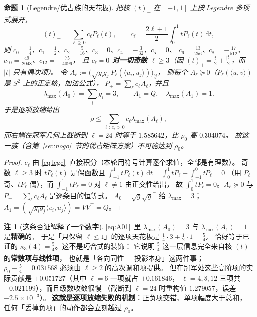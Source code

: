 \documentclass[UTF8,11pt]{ctexart}
\newtheorem{proposition}[theorem]{命题}
\theoremstyle{definition}
\newtheorem{remark}[theorem]{注}
\newcommand{\dd}{\,\mathrm{d}}
\begin{document}
\begin{proposition}[Legendre/优占族的天花板]\label{prop:ceilharm}
把核 $(t)_+$ 在 $[-1,1]$ 上按 Legendre 多项式展开，
\begin{equation}\label{eq:legc}
(t)_+=\sum_{\ell\ge0}c_\ell P_\ell(t),\qquad
c_\ell=\frac{2\ell+1}{2}\int_0^1tP_\ell(t)\dd t ,
\end{equation}
则 $c_0=\frac14$、$c_1=\frac12$、$c_2=\frac5{16}$、$c_3=0$、$c_4=-\frac3{32}$、$c_5=0$、
$c_6=\frac{13}{256}$、$c_8=-\frac{17}{512}$、$c_{10}=\frac{49}{2048}$、$c_{12}=-\frac{75}{4096}$，
且 \textbf{$c_\ell=0$ 对一切奇数 $\ell\ge3$}（因 $(t)_+=\frac t2+\frac{|t|}2$，而 $|t|$ 只有偶次项）。
令 $A_\ell:=\bigl(\sqrt{g_ig_j}\,P_\ell(\langle u_i,u_j\rangle)\bigr)_{ij}$，
则每个 $A_\ell\succeq0$（$P_\ell(\langle u,v\rangle)$ 是 $S^2$ 上的正定核，加法公式），
$P_+=\sum_\ell c_\ell A_\ell$，并且
\begin{equation}\label{eq:A01}
\lambda_{\max}(A_0)=\sum_ig_i=3,\qquad A_1=Q,\quad \lambda_{\max}(A_1)=1 .
\end{equation}
于是逐项放缩给出
\[
\rho\le\sum_{\ell:\,c_\ell>0}c_\ell\lambda_{\max}(A_\ell),
\]
而右端在冠军几何上截断到 $\ell=24$ 时等于 $1.585642$，比 $\rho_0$ 高 $0.304074$。
故这一族（含第~\ref{sec:nogo}~节的优占矩阵方案）不可能达到 $\rho_0$。
\end{proposition}

\begin{proof}
$c_\ell$ 由 \eqref{eq:legc}~直接积分（本轮用符号计算逐个求值，全部是有理数）。
奇数 $\ell\ge3$ 时 $tP_\ell(t)$ 是偶函数且 $\int_{-1}^1tP_\ell(t)\dd t=\int_0^1tP_\ell+\int_{-1}^0tP_\ell=0$
（用 $P_\ell$ 奇、$tP_\ell$ 偶），而 $\int_{-1}^1tP_\ell=0$ 对 $\ell\ne1$ 由正交性给出，
故 $\int_0^1tP_\ell=0$。$A_\ell\succeq0$ 与 $P_+=\sum_\ell c_\ell A_\ell$ 是逐条目的恒等式。
$A_0=\sqrt g\sqrt g{}^\top$ 给 $\lambda_{\max}=3$；$A_1=(\sqrt{g_ig_j}\langle u_i,u_j\rangle)=VV^\top=Q$。
\end{proof}

\begin{remark}[这条否证解释了一个数字]\label{rmk:harm54}
\eqref{eq:A01}~里 $\lambda_{\max}(A_0)=3$ 与 $\lambda_{\max}(A_1)=1$ 是\textbf{精确}的，
于是「只保留 $\ell\le1$」的逐项天花板是 $\frac14\cdot3+\frac12\cdot1=\frac54$，
恰好等于已证的 $\kappa_3(4)=\frac54$。这不是巧合式的装饰：
它说明 $\frac54$ 这一层信息完全来自核 $(t)_+$ 的\textbf{常数项与线性项}，
也就是「各向同性 $+$ 投影本身」这两件事；
$\rho_0-\frac54=0.031568$ 必须由 $\ell\ge2$ 的高次调和项提供。
但在冠军处这些高阶项的实际贡献是 $+0.051727$（其中 $\ell=6$ 一项就占 $+0.061846$，
$\ell=4,8,12$ 三项共 $-0.021199$），而且级数收敛很慢
（截断到 $\ell=24$ 时重构值 $1.279057$，误差 $-2.5\times10^{-3}$）。
\textbf{这就是逐项放缩失败的机制}：正负项交错、单项幅度大于总和，
任何「丢掉负项」的动作都会立刻越过 $\rho_0$。
\end{remark}
\end{document}
